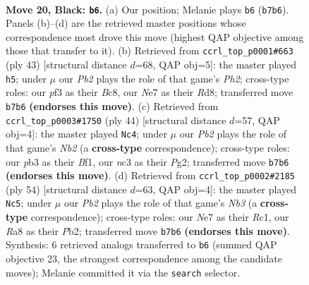 \documentclass[11pt]{article}
\begin{document}
\clearpage

\begin{figure}[p]\centering
\begin{subfigure}{0.46\textwidth}\centering
\resizebox{\linewidth}{!}{%
\newchessgame
\chessboard[
  setfen={r1b3k1/ppppn3/7p/5pp1/8/1PN2PP1/P1PPB2P/R5K1 b - - 0 20},
  showmover=false,
  pgfstyle=straightmove, color=movearrow, markmove={b7-b6}
]}
\caption{}
\end{subfigure}\hfill
\begin{subfigure}{0.46\textwidth}\centering
\resizebox{\linewidth}{!}{%
\newchessgame
\chessboard[
  setfen={2br1k2/2p2p1p/ppnn4/6p1/8/N1PN1P2/PPB3PP/3R2K1 b - - 1 22},
  showmover=false,
  pgfstyle=straightmove, color=movearrow, markmove={h7-h5}
]}
\caption{}
\end{subfigure}
\\[4pt]
\begin{subfigure}{0.46\textwidth}\centering
\resizebox{\linewidth}{!}{%
\newchessgame
\chessboard[
  setfen={2b1k2r/p4ppp/1n2p3/4P3/3PpP2/8/PN1K2PP/5B1R w k - 1 23},
  showmover=false,
  pgfstyle=straightmove, color=movearrow, markmove={b2-c4}
]}
\caption{}
\end{subfigure}\hfill
\begin{subfigure}{0.46\textwidth}\centering
\resizebox{\linewidth}{!}{%
\newchessgame
\chessboard[
  setfen={1n4k1/1p3pp1/2prp1bp/P7/1p6/1N4PP/1P2PPB1/2R3K1 w - - 1 28},
  showmover=false,
  pgfstyle=straightmove, color=movearrow, markmove={b3-c5}
]}
\caption{}
\end{subfigure}
\caption{\textbf{Move 20, Black: \texttt{b6}.} (a) Our position; Melanie plays \texttt{b6} (\texttt{b7b6}). Panels (b)--(d) are the retrieved master positions whose correspondence most drove this move (highest QAP objective among those that transfer to it). (b) Retrieved from \texttt{ccrl\_top\_p0001\#663} (ply 43) [structural distance $d$=68, QAP obj=5]: the master played \texttt{h5}; under $\mu$ our \emph{Pb2} plays the role of that game's \emph{Ph2}; cross-type roles: our \emph{p}f3 as their \emph{B}c8, our \emph{N}e7 as their \emph{R}d8; transferred move \texttt{b7b6} \textbf{(endorses this move)}. (c) Retrieved from \texttt{ccrl\_top\_p0003\#1750} (ply 44) [structural distance $d$=57, QAP obj=4]: the master played \texttt{Nc4}; under $\mu$ our \emph{Pb2} plays the role of that game's \emph{Nb2} (a \textbf{cross-type} correspondence); cross-type roles: our \emph{p}b3 as their \emph{B}f1, our \emph{n}c3 as their \emph{P}g2; transferred move \texttt{b7b6} \textbf{(endorses this move)}. (d) Retrieved from \texttt{ccrl\_top\_p0002\#2185} (ply 54) [structural distance $d$=63, QAP obj=4]: the master played \texttt{Nc5}; under $\mu$ our \emph{Pb2} plays the role of that game's \emph{Nb3} (a \textbf{cross-type} correspondence); cross-type roles: our \emph{N}e7 as their \emph{R}c1, our \emph{R}a8 as their \emph{P}b2; transferred move \texttt{b7b6} \textbf{(endorses this move)}. Synthesis: 6 retrieved analogs transferred to \texttt{b6} (summed QAP objective 23, the strongest correspondence among the candidate moves); Melanie committed it via the \texttt{search} selector.}
\label{fig:thought-m39}
\end{figure}
\end{document}
